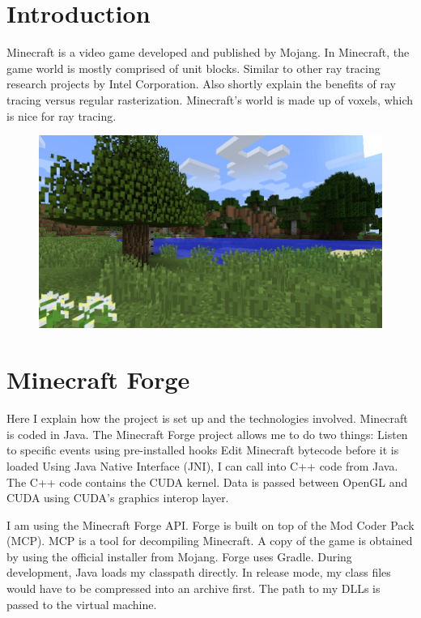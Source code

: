 \documentclass[]{article}
\begin{document}
\newpage
\tableofcontents
\newpage

\section{Introduction}
Minecraft is a video game developed and published by Mojang.
In Minecraft, the game world is mostly comprised of unit blocks.
Similar to other ray tracing research projects by Intel Corporation.
Also shortly explain the benefits of ray tracing versus regular rasterization.
Minecraft's world is made up of voxels, which is nice for ray tracing.

\begin{figure}
  \includegraphics[width=\textwidth]{ss-worldgen.png}
  \centering
\end{figure}

\section{Minecraft Forge}
Here I explain how the project is set up and the technologies involved.
Minecraft is coded in Java.
The Minecraft Forge project allows me to do two things:
  Listen to specific events using pre-installed hooks
  Edit Minecraft bytecode before it is loaded
Using Java Native Interface (JNI), I can call into C++ code from Java.
The C++ code contains the CUDA kernel.
Data is passed between OpenGL and CUDA using CUDA's graphics interop layer.

I am using the Minecraft Forge API.
Forge is built on top of the Mod Coder Pack (MCP).
MCP is a tool for decompiling Minecraft.
A copy of the game is obtained by using the official installer from Mojang.
Forge uses Gradle.
During development, Java loads my classpath directly.
In release mode, my class files would have to be compressed into an archive first.
The path to my DLLs is passed to the virtual machine.
\end{document}
